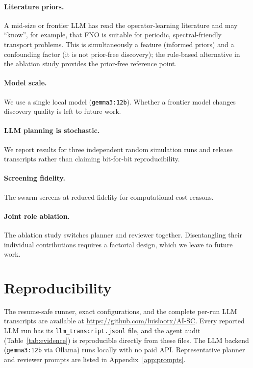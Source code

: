 \documentclass{article}
\begin{document}
\paragraph{Literature priors.} A mid-size or frontier LLM has read the
operator-learning literature and may ``know'', for example, that FNO is suitable for periodic, spectral-friendly transport problems. This is simultaneously a feature (informed priors) and a confounding factor (it is not prior-free discovery); the rule-based alternative in the ablation study provides the prior-free reference point.
\paragraph{Model scale.} We use a single local model (\texttt{gemma3:12b}).
Whether a frontier model changes discovery quality is left to future work.
\paragraph{LLM planning is stochastic.} We report results for three independent random simulation runs and
release transcripts rather than claiming bit-for-bit reproducibility.
\paragraph{Screening fidelity.} The swarm screens at reduced fidelity for computational cost reasons.
\paragraph{Joint role ablation.} The ablation study switches planner and reviewer
together. Disentangling their individual contributions requires a factorial design, which we leave to future work.

\section{Reproducibility}\label{sec:repro}
The resume-safe runner, exact configurations, and the complete per-run LLM transcripts are available at \url{https://github.com/luislootx/AI-SC}. Every reported LLM run has its \texttt{llm\_transcript.jsonl} file, and the agent audit (Table~\ref{tab:evidence}) is reproducible directly from these files. The LLM backend (\texttt{gemma3:12b} via Ollama) runs locally with no paid API. Representative planner and reviewer prompts are listed in Appendix~\ref{app:prompts}.
\end{document}
